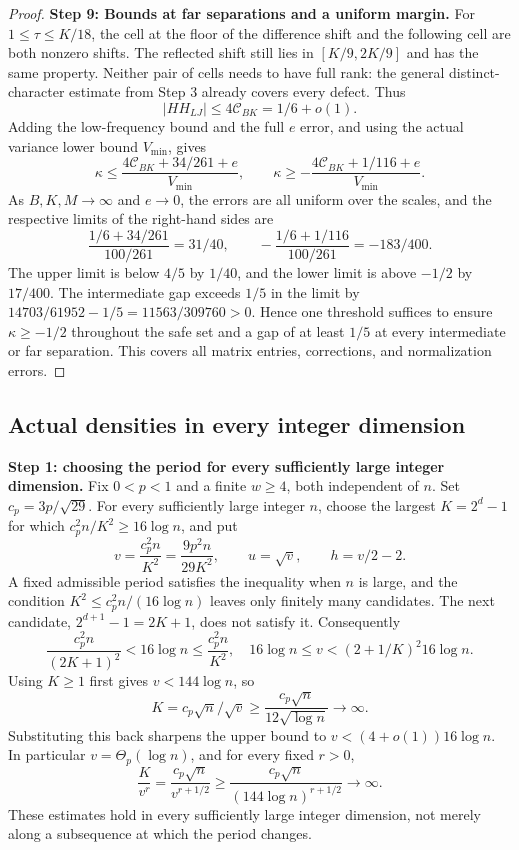 \documentclass[a4paper,11pt]{article}
\theoremstyle{remark}
\begin{document}
\begin{proof}
\textbf{Step 9: Bounds at far separations and a uniform margin.}
For $1\le\tau\le K/18$, the cell at the floor of the difference shift and the following cell are both nonzero shifts.
The reflected shift still lies in $[K/9,2K/9]$ and has the same property.
Neither pair of cells needs to have full rank: the general distinct-character estimate from Step 3 already covers every defect. Thus
\[
 |HH_{LJ}|\le4\mathcal C_{BK}=1/6+o(1).
\]
Adding the low-frequency bound and the full $e$ error, and using the actual variance lower bound $V_{\min}$, gives
\[
 \kappa\le\frac{4\mathcal C_{BK}+34/261+e}{V_{\min}},
 \qquad\kappa\ge-\frac{4\mathcal C_{BK}+1/116+e}{V_{\min}}.
\]
As $B,K,M\to\infty$ and $e\to0$, the errors are all uniform over the scales, and the respective limits of the right-hand sides are
\[
 \frac{1/6+34/261}{100/261}=31/40,
 \qquad-\frac{1/6+1/116}{100/261}=-183/400.
\]
The upper limit is below $4/5$ by $1/40$, and the lower limit is above $-1/2$ by $17/400$.
The intermediate gap exceeds $1/5$ in the limit by
$14703/61952-1/5=11563/309760>0$.
Hence one threshold suffices to ensure $\kappa\ge-1/2$ throughout the safe set
and a gap of at least $1/5$ at every intermediate or far separation. This covers all matrix entries, corrections, and normalization errors.
\end{proof}

\subsection{Actual densities in every integer dimension}
\textbf{Step 1: choosing the period for every sufficiently large integer dimension.}
Fix $0<p<1$ and a finite $w\ge4$, both independent of $n$.
Set $c_p=3p/\sqrt{29}$. For every sufficiently large integer $n$,
choose the largest $K=2^d-1$ for which $c_p^2n/K^2\ge16\log n$, and put
\[
 v=\frac{c_p^2n}{K^2}=\frac{9p^2n}{29K^2},
 \qquad u=\sqrt v,\qquad h=v/2-2.
\]
A fixed admissible period satisfies the inequality when $n$ is large,
and the condition $K^2\le c_p^2n/(16\log n)$ leaves only finitely many
candidates. The next candidate, $2^{d+1}-1=2K+1$, does not satisfy it.
Consequently
\[
 \frac{c_p^2n}{(2K+1)^2}<16\log n\le\frac{c_p^2n}{K^2},
 \quad 16\log n\le v<(2+1/K)^2 16\log n.
\]
Using $K\ge1$ first gives $v<144\log n$, so
\[
 K=c_p\sqrt n/\sqrt v\ge\frac{c_p\sqrt n}{12\sqrt{\log n}}\to\infty.
\]
Substituting this back sharpens the upper bound to
$v<(4+o(1))16\log n$. In particular $v=\Theta_p(\log n)$, and for every
fixed $r>0$,
\[
 \frac K{v^r}=\frac{c_p\sqrt n}{v^{r+1/2}}
 \ge\frac{c_p\sqrt n}{(144\log n)^{r+1/2}}\to\infty.
\]
These estimates hold in every sufficiently large integer dimension, not
merely along a subsequence at which the period changes.
\end{document}
